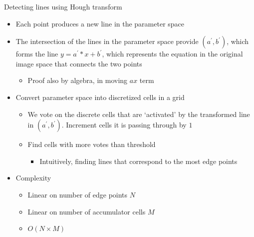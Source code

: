 Detecting lines using Hough transform
\begin{itemize}
    \item Each point produces a new line in the parameter space
    \item The intersection of the lines in the parameter space provide $(a^\prime,b^\prime)$, which forms the line $y=a^\prime*x + b^\prime$, which represents the equation in the original image space that connects the two points
    \begin{itemize}
        \item Proof also by algebra, in moving $ax$ term
    \end{itemize}
    \item Convert parameter space into discretized cells in a grid
    \begin{itemize}
        \item We vote on the discrete cells that are `activated' by the transformed line in $(a^\prime, b^\prime)$. Increment cells it is passing through by $1$
        \item Find cells with more votes than threshold
        \begin{itemize}
            \item Intuitively, finding lines that correspond to the most edge points
        \end{itemize}
    \end{itemize}
    \item Complexity
    \begin{itemize}
        \item Linear on number of edge points $N$
        \item Linear on number of accumulator cells $M$
        \item $O(N\times M)$
    \end{itemize}
\end{itemize}